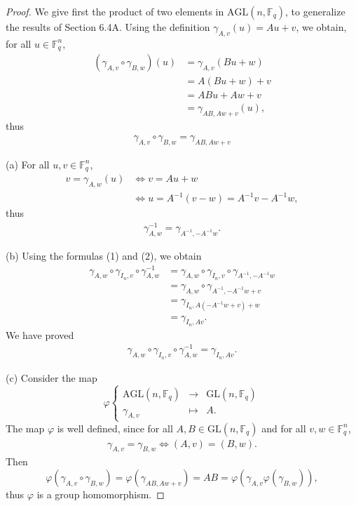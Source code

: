 \documentclass[11pt,a4paper]{article}
\newcommand{\F}{\mathbb{F}}
\begin{document}
\begin{proof}
We give first the product of two elements in $\mathrm{AGL}(n,\F_q)$, to generalize the results of Section 6.4A. Using the definition $\gamma_{A,v}(u) = Au+v$, we obtain, for all $u \in \F_q^n$,
\begin{align*}
(\gamma_{A,v} \circ \gamma_{B,w})(u) &= \gamma_{A,v}(Bu + w)\\
&= A(Bu + w) + v\\
&= ABu + Aw +v\\
&= \gamma_{AB,Aw+v}(u),
\end{align*}
thus
\begin{align}
\gamma_{A,v} \circ \gamma_{B,w} = \gamma_{AB,Aw+v}
\end{align}
\item[(a)] For all $u,v \in \F_q^n$,
\begin{align*}
v = \gamma_{A,w}(u) &\iff v = Au + w\\
&\iff u = A^{-1}(v - w) = A^{-1} v - A^{-1}w,
\end{align*}
thus
\begin{align}
\gamma_{A,w}^{-1} = \gamma_{A^{-1}, - A^{-1}w}.
\end{align}
\item[(b)]
Using the formulas (1) and (2), we obtain
\begin{align*}
\gamma_{A,w} \circ \gamma_{I_n,v} \circ \gamma_{A,w}^{-1} &= \gamma_{A,w} \circ \gamma_{I_n,v} \circ \gamma_{A^{-1}, - A^{-1}w}\\
&= \gamma_{A,w} \circ \gamma_{A^{-1}, -A^{-1}w + v}\\
&=\gamma_{I_n,A(-A^{-1}w + v) + w}\\
&=\gamma_{I_n,Av}.
\end{align*}
We have proved
\begin{align}
\gamma_{A,w} \circ \gamma_{I_n,v} \circ \gamma_{A,w}^{-1}  = \gamma_{I_n,Av}.
\end{align}


\item[(c)] Consider the map
$$
\varphi
\left\{
\begin{array}{ccc}
\mathrm{AGL}(n,\F_q) & \to &\mathrm{GL}(n,\F_q)\\
\gamma_{A,v} & \mapsto &A.
\end{array}
\right.
$$
The map $\varphi$ is well defined, since for all $A,B \in \mathrm{GL}(n,\F_q)$ and for all $v,w \in \F_q^n$,
\begin{align}
\gamma_{A,v} = \gamma_{B,w} \iff (A,v) = (B,w).
\end{align}
Then 
$$
\varphi(\gamma_{A,v} \circ \gamma_{B,w}) =\varphi( \gamma_{AB,Aw+v}) = AB = \varphi(\gamma_{A,v} \varphi(\gamma_{B,w})),
$$
thus $\varphi$ is a group homomorphism.


\end{proof}
\end{document}
